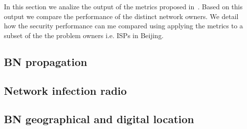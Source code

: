 \label{cap:sec2}
In this section we analize the output of the metrics proposed in~\cite{owr_article}. Based on this output we compare the performance of the distinct network owners. We detail how the security performance can me compared using applying the metrics to a subset of the the problem owners i.e. ISPs in Beijing.

\subsection{BN propagation}
\subsection{Network infection radio}
\subsection{BN geographical and digital location}
